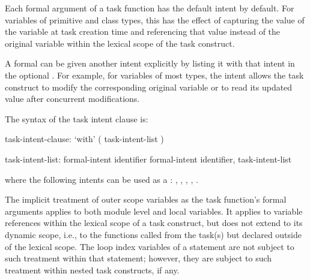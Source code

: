 Each formal argument of a task function has the default intent by default.
For variables of primitive and class types, this has the effect
of capturing the value of the variable at task creation time
and referencing that value instead of the original variable
within the lexical scope of the task construct.

A formal can be given another intent explicitly by listing it
with that intent in the optional .
For example, for variables of most types, the  intent allows
the task construct to modify the corresponding original variable
or to read its updated value after concurrent modifications.

The syntax of the task intent clause is:

\begin{syntax}
task-intent-clause:
  `with' ( task-intent-list )

task-intent-list:
  formal-intent identifier
  formal-intent identifier, task-intent-list
\end{syntax}

where the following intents can be used as a :
, , , , .


The implicit treatment of outer scope variables as the task function's
formal arguments applies to both module level and local variables.
It applies to variable references within the lexical scope
of a task construct, but does not extend to its dynamic scope, i.e.,
to the functions called from the task(s) but declared outside of
the lexical scope.
The loop index variables of a  statement are not
subject to such treatment within that statement; however, they are
subject to such treatment within nested task constructs, if any.


